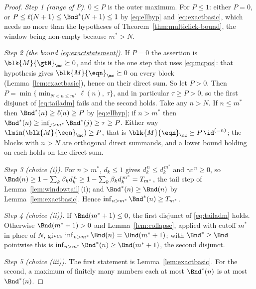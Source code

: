 \begin{proof}
\emph{Step 1 (range of $P$).} $0\le P$ is the outer maximum. For $P\le1$:
either $P=0$, or $P\le\ell(N+1)\le\Bnd^{\ast}(N+1)\le1$ by \eqref{eq:ellhyp}
and \eqref{eq:exactbasic}, which needs no more than the hypotheses of
Theorem~\ref{thm:multiclick-bound}, the window being non-empty because
$m^{\ast}>N$.

\emph{Step 2 (the bound \eqref{eq:exactstatement}).} If $P=0$ the assertion is
$\blk{M}{\gtN}_{\mc}\succeq0$, and this is the one step that uses
\eqref{eq:mcpos}: that hypothesis gives $\blk{M}{\eqn}_{\mc}\succeq0$ on every
block (Lemma~\ref{lem:exactbasic}), hence on their direct sum. So let $P>0$.
Then
$P=\min\{\min_{N<n\le m^{\ast}}\ell(n),\ \tau\}$, and in particular
$\tau\ge P>0$, so the first disjunct of \eqref{eq:tailadm} fails and the second
holds. Take any $n>N$. If $n\le m^{\ast}$ then $\Bnd^{\ast}(n)\ge\ell(n)\ge P$
by \eqref{eq:ellhyp}; if $n>m^{\ast}$ then
$\Bnd^{\ast}(n)\ge\inf_{j>m^{\ast}}\Bnd^{\ast}(j)\ge\tau\ge P$. Either way
$\lmin(\blk{M}{\eqn}_{\mc})\ge P$, that is
$\blk{M}{\eqn}_{\mc}\succeq P\,\id^{(=n)}$; the blocks with $n>N$ are
orthogonal direct summands, and a lower bound holding on each holds on the
direct sum.

\emph{Step 3 (choice (i)).} For $n>m^{\ast}$, $d_k\le1$ gives
$d_k^{\,n}\le d_k^{\,m^{\ast}}$ and $\gamma c^{\,n}\ge0$, so
$\Bnd(n)\ge1-\sum_k\beta_kd_k^{\,n}\ge
1-\sum_k\beta_kd_k^{\,m^{\ast}}=T_{m^{\ast}}$, the tail step of
Lemma~\ref{lem:windowtail}\,(i); and $\Bnd^{\ast}(n)\ge\Bnd(n)$ by
Lemma~\ref{lem:exactbasic}. Hence
$\inf_{n>m^{\ast}}\Bnd^{\ast}(n)\ge T_{m^{\ast}}$.

\emph{Step 4 (choice (ii)).} If $\Bnd(m^{\ast}+1)\le0$, the first disjunct of
\eqref{eq:tailadm} holds. Otherwise $\Bnd(m^{\ast}+1)>0$ and
Lemma~\ref{lem:collapse}, applied with cutoff $m^{\ast}$ in place of $N$,
gives $\inf_{n>m^{\ast}}\Bnd(n)=\Bnd(m^{\ast}+1)$; with
$\Bnd^{\ast}\ge\Bnd$ pointwise this is
$\inf_{n>m^{\ast}}\Bnd^{\ast}(n)\ge\Bnd(m^{\ast}+1)$, the second disjunct.

\emph{Step 5 (choice (iii)).} The first statement is
Lemma~\ref{lem:exactbasic}. For the second, a maximum of finitely many
numbers each at most $\Bnd^{\ast}(n)$ is at most $\Bnd^{\ast}(n)$.
\end{proof}
